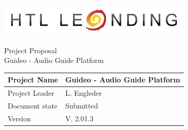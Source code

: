 \documentclass[12pt]{article}
\theoremstyle{definition}
\newcommand{\productname}{Guideo - Audio Guide Platform}
\newcommand{\projectleader}{L. Engleder}
\newcommand{\documentstatus}{Submitted}
\newcommand{\version}{V. 2.01.3}
\begin{document}
\begin{titlepage}
\begin{flushright}
\includegraphics[scale=.5]{htlleondinglogo.png}\\
\end{flushright}
 
\vspace{10em}
 
\begin{center}
{\Huge Project Proposal} \\[3em]
{\LARGE \productname} \\[3em]
\end{center}
 
\begin{flushleft}
\begin{tabular}{|l|l|}
\hline
Project Name & \productname \\ \hline
Project Leader & \projectleader \\ \hline
Document state & \documentstatus \\ \hline
Version & \version \\ \hline
\end{tabular}
\end{flushleft}
 
\end{titlepage}
\end{document}
